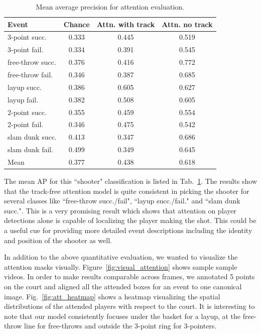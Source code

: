 \begin{table}[ht!]
\begin{center}
  \vspace{-4mm}
\small
 \begin{tabular}{|l|c|c|c|}
  \hline
Event            & Chance & Attn. with track & Attn. no track \\ \hline \hline
3-point succ.    & 0.333 & 0.445 & 0.519 \\ 
3-point fail.    & 0.334 & 0.391 & 0.545 \\ 
free-throw succ. & 0.376 & 0.416 & 0.772 \\ 
free-throw fail. & 0.346 & 0.387 & 0.685 \\  
layup succ.      & 0.386 & 0.605 & 0.627 \\ 
layup fail.      & 0.382 & 0.508 & 0.605 \\ 
2-point succ.    & 0.355 & 0.459 & 0.554 \\ 
2-point fail.    & 0.346 & 0.475 & 0.542 \\ 
slam dunk succ.  & 0.413 & 0.347 & 0.686 \\ 
slam dunk fail.  & 0.499 & 0.349 & 0.645 \\ \hline \hline  
Mean             & 0.377 & 0.438 & 0.618 \\ \hline
  \end{tabular}
\end{center}
  \caption{Mean average precision for attention evaluation.}
  \vspace{-4mm}
  \label{tab:attention_res}
\end{table}


The mean AP for this ``shooter"  classification is listed in
Tab.~\ref{tab:attention_res}.  The results show that the track-free attention
model is quite consistent in picking the shooter for several classes like
``free-throw succ./fail", ``layup succ./fail." and ``slam dunk succ.". This is
a very promising result which shows that attention on player detections alone
is capable of localizing the player making the shot. This could be a useful cue
for providing more detailed event descriptions including the identity and
position of the shooter as well.

In addition to the above quantitative evaluation, we wanted to visualize the
attention masks visually.  Figure~\ref{fig:visual_attention} shows sample
sample videos.  In order to make results comparable across frames, we annotated
5 points on the court and aligned all the attended boxes for an event to one
canonical image.  Fig.~\ref{fig:att_heatmap} shows a heatmap  visualizing the
spatial distributions of the attended players with respect to the court. It is
interesting to note that our model consistently focuses under the basket for a
layup, at the free-throw line for free-throws and outside the 3-point ring for
3-pointers.

